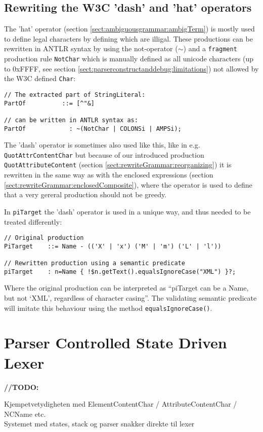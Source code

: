 \subsection{Rewriting the W3C 'dash' and 'hat' operators}
The 'hat' operator (section \ref{sect:ambiguousgrammar:ambigTerm}) is mostly used to define legal characters by defining which are illigal. These productions can be rewritten in ANTLR syntax by using the not-operator ($\sim$) and a \verb!fragment! production rule \verb!NotChar! which is manually defined as all unicode characters (up to 0xFFFF, see section \ref{sect:parserconstructanddebug:limitations}) not allowed by the W3C defined \verb!Char!:
\begin{verbatim}
// The extracted part of StringLiteral:
PartOf          ::= [^"&]

// can be written in ANTLR syntax as:
PartOf            : ~(NotChar | COLONSi | AMPSi);
\end{verbatim}
The 'dash' operator is sometimes also used like this, like in e.g. \verb!QuotAttrContentChar! but because of our introduced production \verb!QuotAttributeContent! (section \ref{sect:rewriteGrammar:reorganizing}) it is rewritten in the same way as with the enclosed expressions (section \ref{sect:rewriteGrammar:enclosedComposite}), where the operator is used to define that a very gereral production should not be greedy. 

In \verb!piTarget! the 'dash' operator is used in a unique way, and thus needed to be treated differently:
\begin{verbatim}
// Original production
PiTarget    ::= Name - (('X' | 'x') ('M' | 'm') ('L' | 'l'))

// Rewritten production using a semantic predicate
piTarget    : n=Name { !$n.getText().equalsIgnoreCase("XML") }?;
\end{verbatim}
Where the original production can be interpreted as ``piTarget can be a Name, but not `XML', regardless of character casing''. The validating semantic predicate will imitate this behaviour using the method \verb!equalsIgnoreCase()!.

\section{Parser Controlled State Driven Lexer}

\textbf{\LARGE //TODO:} 

Kjempetvetydigheten med ElementContentChar / AttributeContentChar / NCName etc. \\
Systemet med states, stack og parser snakker direkte til lexer

